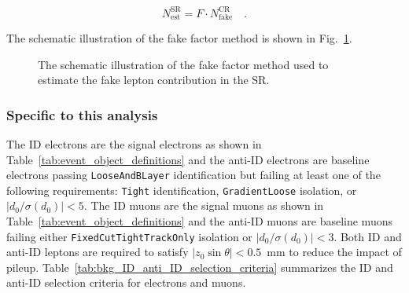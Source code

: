 \begin{equation}
    N^\mathrm{SR}_\mathrm{est} = F \cdot N^\mathrm{CR}_\mathrm{fake} \quad .
    \label{eq:bkg_estimated_fake_leptons}
\end{equation}

The schematic illustration of the fake factor method is shown in Fig.~\ref{fig:bkg_fake_factor_method}.

\begin{figure}[htb]
    \begin{center}
        
        \caption{The schematic illustration of the fake factor method used to estimate the fake lepton contribution in the SR.}
        \label{fig:bkg_fake_factor_method}
    \end{center}
\end{figure}


\subsubsection{Specific to this analysis}
\label{subsubsec:bkg_fake_specific}
The ID electrons are the signal electrons as shown in Table~\ref{tab:event_object_definitions} and the anti-ID electrons are baseline electrons passing \texttt{LooseAndBLayer} identification but failing at least one of the following requirements: \texttt{Tight} identification, \texttt{GradientLoose} isolation, or $|d_{0}/\sigma(d_{0})| < 5$.
The ID muons are the signal muons as shown in Table~\ref{tab:event_object_definitions} and the anti-ID muons are baseline muons failing either \texttt{FixedCutTightTrackOnly} isolation or $|d_{0}/\sigma(d_{0})| < 3$.
Both ID and anti-ID leptons are required to satisfy $|z_{0} \sin \theta| < 0.5$~mm to reduce the impact of pileup.
Table~\ref{tab:bkg_ID_anti_ID_selection_criteria} summarizes the ID and anti-ID selection criteria for electrons and muons.


